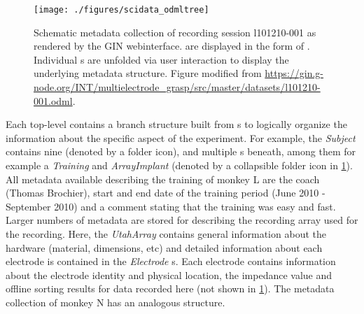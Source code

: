 \begin{figure}[htbp]
 \texttt{[image: ./figures/scidata\_odmltree]}
 \caption[Schematic metadata collection of session l101210-001]{Schematic metadata collection of recording session l101210-001 as rendered by the GIN webinterface.  are displayed in the form of . Individual s are unfolded via user interaction to display the underlying metadata structure. Figure modified from \url{https://gin.g-node.org/INT/multielectrode_grasp/src/master/datasets/l101210-001.odml}.}
 \label{fig:scidata_l101210odml}
\end{figure}

Each top-level  contains a branch structure built from s to logically organize the information about the specific aspect of the experiment. For example, the \textit{Subject}  contains nine  (denoted by a folder icon), and multiple s beneath, among them for example a  \textit{Training}  and \textit{ArrayImplant}  (denoted by a collapsible folder icon in \cref{fig:scidata_l101210odml}). All metadata available describing the training of monkey L are the coach (Thomas Brochier), start and end date of the training period (June 2010 - September 2010) and a comment stating that the training was easy and fast. Larger numbers of metadata are stored for describing the recording array used for the recording. Here, the  \textit{UtahArray} contains general information about the hardware (material, dimensions, etc) and detailed information about each electrode is contained in the \textit{Electrode} s. Each electrode  contains information about the electrode identity and physical location, the impedance value and offline sorting results for data recorded here (not shown in \cref{fig:scidata_l101210odml}). The metadata collection of monkey N has an analogous structure.



